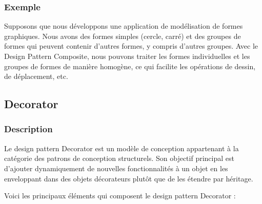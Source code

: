 \subsubsection{Exemple}

Supposons que nous développons une application de modélisation de formes graphiques. Nous avons des formes simples (cercle, carré) et des groupes de formes qui peuvent contenir d'autres formes, y compris d'autres groupes. Avec le Design Pattern Composite, nous pouvons traiter les formes individuelles et les groupes de formes de manière homogène, ce qui facilite les opérations de dessin, de déplacement, etc.




\newpage

\subsection{Decorator}

\subsubsection{Description}

Le design pattern Decorator est un modèle de conception appartenant à la catégorie des patrons de conception structurels. Son objectif principal est d'ajouter dynamiquement de nouvelles fonctionnalités à un objet en les enveloppant dans des objets décorateurs plutôt que de les étendre par héritage.

Voici les principaux éléments qui composent le design pattern Decorator :

